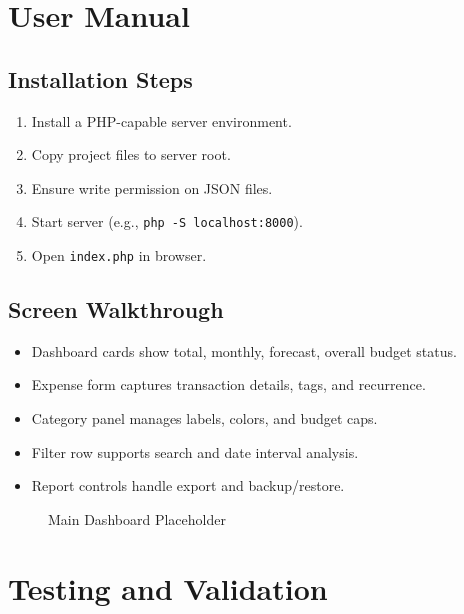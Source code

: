 \documentclass[conference]{IEEEtran}
\begin{document}
\section{User Manual}
\subsection{Installation Steps}
\begin{enumerate}
    \item Install a PHP-capable server environment.
    \item Copy project files to server root.
    \item Ensure write permission on JSON files.
    \item Start server (e.g., \texttt{php -S localhost:8000}).
    \item Open \texttt{index.php} in browser.
\end{enumerate}

\subsection{Screen Walkthrough}
\begin{itemize}
    \item Dashboard cards show total, monthly, forecast, overall budget status.
    \item Expense form captures transaction details, tags, and recurrence.
    \item Category panel manages labels, colors, and budget caps.
    \item Filter row supports search and date interval analysis.
    \item Report controls handle export and backup/restore.
\end{itemize}

\begin{figure}[H]
\centering
{}
\caption{Main Dashboard Placeholder}
\label{fig:dashboard}
\end{figure}

\section{Testing and Validation}
\end{document}
